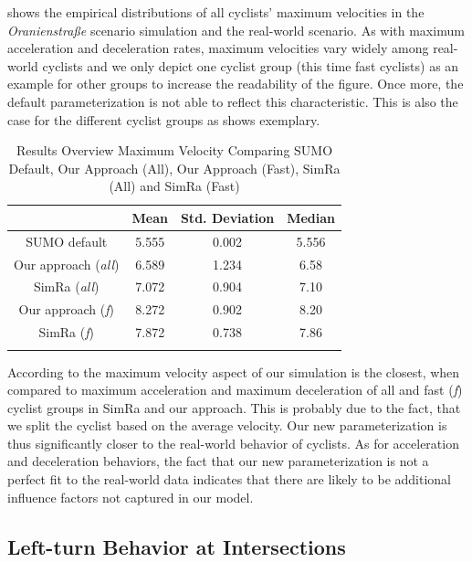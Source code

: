  shows the empirical distributions of all cyclists' maximum velocities in the \textit{Oranienstraße} scenario simulation and the real-world scenario.
As with maximum acceleration and deceleration rates, maximum velocities vary widely among real-world cyclists and we only depict one cyclist group (this time fast cyclists) as an example for other groups to increase the readability of the figure.
Once more, the default parameterization is not able to reflect this characteristic.
This is also the case for the different cyclist groups as  shows exemplary.
\begin{table}
\centering
\caption{Results Overview Maximum Velocity Comparing SUMO Default, Our Approach (All), Our Approach (Fast), SimRa (All) and SimRa (Fast)}%
\label{tab:results_overview_vel}
\begin{tabular}{cccc}
\toprule
& Mean & Std. Deviation & Median\\
\midrule
\midrule
SUMO default & \num{5.555} & \num{0.002} & \num{5.556} \\
\midrule
Our approach (\textit{all}) & \num{6.589} & \num{1.234} & \num{6.58} \\
SimRa (\textit{all}) & \num{7.072} & \num{0.904} & \num{7.10} \\
\midrule
Our approach (\textit{f}) & \num{8.272} & \num{0.902} & \num{8.20} \\
SimRa (\textit{f}) & \num{7.872} & \num{0.738} & \num{7.86} \\
\bottomrule&
\end{tabular}
\end{table}
According to  the maximum velocity aspect of our simulation is the closest, when compared to maximum acceleration and maximum deceleration of all and fast (\textit{f}) cyclist groups in SimRa and our approach.
This is probably due to the fact, that we split the cyclist based on the average velocity.
Our new parameterization is thus significantly closer to the real-world behavior of cyclists.
As for acceleration and deceleration behaviors, the fact that our new parameterization is not a perfect fit to the real-world data indicates that there are likely to be additional influence factors not captured in our model.

\subsection{Left-turn Behavior at Intersections}
\label{subsec:left-turn_behavior_at_intersections_evaluation}

